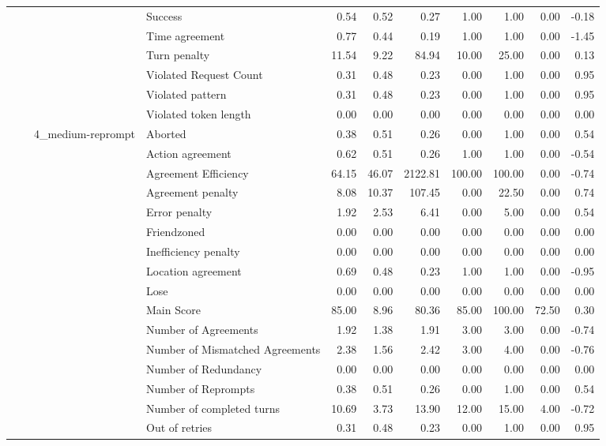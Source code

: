\begin{tabular}{llllrrrrrrr}
 &  &  & Success & 0.54 & 0.52 & 0.27 & 1.00 & 1.00 & 0.00 & -0.18 \\
 &  &  & Time agreement & 0.77 & 0.44 & 0.19 & 1.00 & 1.00 & 0.00 & -1.45 \\
 &  &  & Turn penalty & 11.54 & 9.22 & 84.94 & 10.00 & 25.00 & 0.00 & 0.13 \\
 &  &  & Violated Request Count & 0.31 & 0.48 & 0.23 & 0.00 & 1.00 & 0.00 & 0.95 \\
 &  &  & Violated pattern & 0.31 & 0.48 & 0.23 & 0.00 & 1.00 & 0.00 & 0.95 \\
 &  &  & Violated token length & 0.00 & 0.00 & 0.00 & 0.00 & 0.00 & 0.00 & 0.00 \\
\cline{3-11}
 &  & \multirow[t]{27}{*}{4_medium-reprompt} & Aborted & 0.38 & 0.51 & 0.26 & 0.00 & 1.00 & 0.00 & 0.54 \\
 &  &  & Action agreement & 0.62 & 0.51 & 0.26 & 1.00 & 1.00 & 0.00 & -0.54 \\
 &  &  & Agreement Efficiency & 64.15 & 46.07 & 2122.81 & 100.00 & 100.00 & 0.00 & -0.74 \\
 &  &  & Agreement penalty & 8.08 & 10.37 & 107.45 & 0.00 & 22.50 & 0.00 & 0.74 \\
 &  &  & Error penalty & 1.92 & 2.53 & 6.41 & 0.00 & 5.00 & 0.00 & 0.54 \\
 &  &  & Friendzoned & 0.00 & 0.00 & 0.00 & 0.00 & 0.00 & 0.00 & 0.00 \\
 &  &  & Inefficiency penalty & 0.00 & 0.00 & 0.00 & 0.00 & 0.00 & 0.00 & 0.00 \\
 &  &  & Location agreement & 0.69 & 0.48 & 0.23 & 1.00 & 1.00 & 0.00 & -0.95 \\
 &  &  & Lose & 0.00 & 0.00 & 0.00 & 0.00 & 0.00 & 0.00 & 0.00 \\
 &  &  & Main Score & 85.00 & 8.96 & 80.36 & 85.00 & 100.00 & 72.50 & 0.30 \\
 &  &  & Number of Agreements & 1.92 & 1.38 & 1.91 & 3.00 & 3.00 & 0.00 & -0.74 \\
 &  &  & Number of Mismatched Agreements & 2.38 & 1.56 & 2.42 & 3.00 & 4.00 & 0.00 & -0.76 \\
 &  &  & Number of Redundancy & 0.00 & 0.00 & 0.00 & 0.00 & 0.00 & 0.00 & 0.00 \\
 &  &  & Number of Reprompts & 0.38 & 0.51 & 0.26 & 0.00 & 1.00 & 0.00 & 0.54 \\
 &  &  & Number of completed turns & 10.69 & 3.73 & 13.90 & 12.00 & 15.00 & 4.00 & -0.72 \\
 &  &  & Out of retries & 0.31 & 0.48 & 0.23 & 0.00 & 1.00 & 0.00 & 0.95 \\

\end{tabular}
